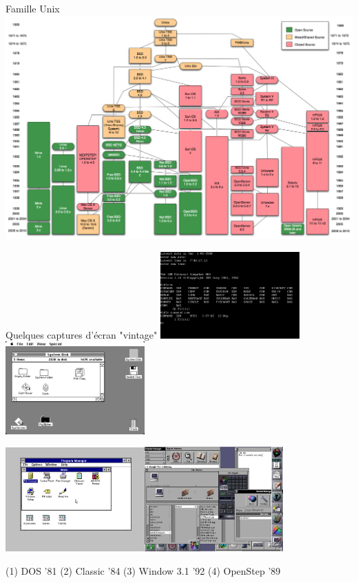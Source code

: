 \documentclass[11pt]{beamer}
\begin{document}
\begin{frame}{Famille Unix}
\centering
\includegraphics[width=\textwidth]{figs/unix.png}
\end{frame}

\begin{frame}{Quelques captures d'écran "vintage"}
  \centering
\includegraphics[width=0.4\textwidth]{figs/DOS.png}\includegraphics[width=0.4\textwidth]{figs/mac.png}

\includegraphics[width=0.4\textwidth]{figs/win31.png}\includegraphics[width=0.4\textwidth]{figs/nextstep.jpg}

(1) DOS '81
(2) Classic '84
(3) Window 3.1 '92
(4) OpenStep '89
\end{frame}
\end{document}
